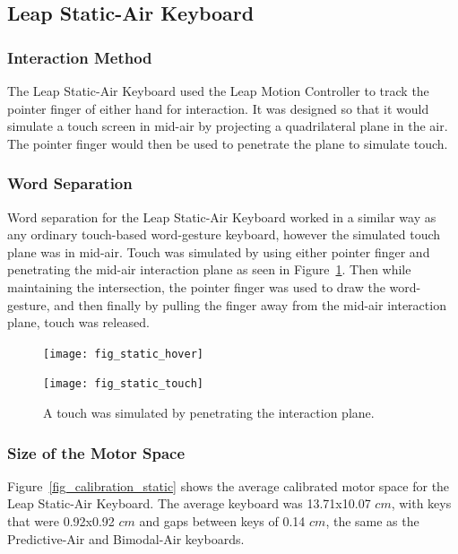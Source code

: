 \subsection{Leap Static-Air Keyboard} \label{static_air}
\subsubsection{Interaction Method}
The Leap Static-Air Keyboard used the Leap Motion Controller to track the pointer finger of either hand for interaction. It was designed so that it would simulate a touch screen in mid-air by projecting a quadrilateral plane in the air. The pointer finger would then be used to penetrate the plane to simulate touch.

\subsubsection{Word Separation}
Word separation for the Leap Static-Air Keyboard worked in a similar way as any ordinary touch-based word-gesture keyboard, however the simulated touch plane was in mid-air. Touch was simulated by using either pointer finger and penetrating the mid-air interaction plane as seen in Figure~\ref{static_press_comparison}. Then while maintaining the intersection, the pointer finger was used to draw the word-gesture, and then finally by pulling the finger away from the mid-air interaction plane, touch was released.

\begin{figure}[b]
	\centering
	\begin{minipage}[t]{5.8in}
		\begin{minipage}[t]{2.85in}
			\texttt{[image: fig\_static\_hover]}
		\end{minipage}
		\begin{minipage}[t]{2.9in}
			\texttt{[image: fig\_static\_touch]}
		\end{minipage}
	\end{minipage}
	\caption[Leap Static-Air Word Separation]{A touch was simulated by penetrating the interaction plane.}
	\label{static_press_comparison}
\end{figure}

\subsubsection{Size of the Motor Space}
Figure~\ref{fig_calibration_static} shows the average calibrated motor space for the Leap Static-Air Keyboard. The average keyboard was 13.71x10.07 $cm$, with keys that were 0.92x0.92 $cm$ and gaps between keys of 0.14 $cm$, the same as the Predictive-Air and Bimodal-Air keyboards.

